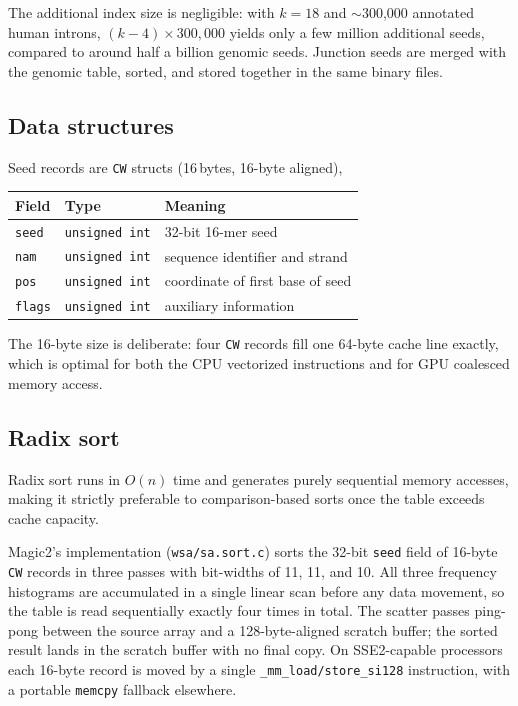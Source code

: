 \documentclass[11pt]{article}
\begin{document}
The additional index size is negligible: with $k = 18$ and
$\sim$300{,}000 annotated human introns, $(k-4) \times 300{,}000$
yields only a few million additional seeds, compared to around 
half a billion genomic seeds.
Junction seeds are merged with the genomic table, sorted, and stored
together in the same binary files.

\subsection{Data structures}
\label{sec:gpu_structs}

Seed records are \texttt{CW} structs (16\,bytes, 16-byte aligned),

\medskip
\begin{center}
\begin{tabular}{lll}
\toprule
Field & Type & Meaning \\
\midrule
\texttt{seed}   & \texttt{unsigned int} & 32-bit 16-mer seed \\
\texttt{nam}    & \texttt{unsigned int} & sequence identifier and strand\\
\texttt{pos}    & \texttt{unsigned int} & coordinate of first base of seed \\
\texttt{flags}  & \texttt{unsigned int}  & auxiliary information \\
\bottomrule
\end{tabular}
\end{center}
\medskip

The 16-byte size is deliberate: four \texttt{CW} records fill one
64-byte cache line exactly, which is optimal for both the CPU
vectorized instructions and for GPU coalesced memory access.

\subsection{Radix sort}
\label{sec:sort}

Radix sort runs in $O(n)$ time and generates purely sequential memory
accesses, making it strictly preferable to comparison-based sorts once
the table exceeds cache capacity.

Magic2's implementation (\texttt{wsa/sa.sort.c}) sorts the 32-bit
\texttt{seed} field of 16-byte \texttt{CW} records in three passes
with bit-widths of 11, 11, and 10.
All three frequency histograms are accumulated in a single linear scan
before any data movement, so the table is read sequentially exactly
four times in total.
The scatter passes ping-pong between the source array and a
128-byte-aligned scratch buffer; the sorted result lands in the
scratch buffer with no final copy.
On SSE2-capable processors each 16-byte record is moved by a single
\texttt{\_mm\_load/store\_si128} instruction, with a portable
\texttt{memcpy} fallback elsewhere.
\end{document}

